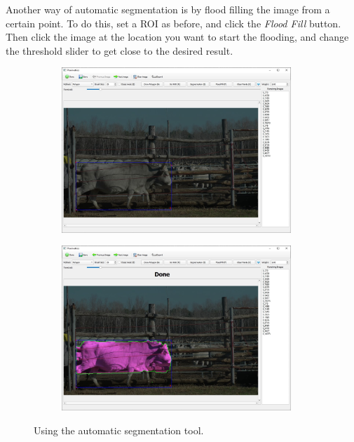 \documentclass[10pt,a4paper,oneside]{report}             %
\begin{document}
Another way of automatic segmentation is by flood filling the image from a certain point. To do this, set a ROI as before, and click the \textit{Flood Fill} button. Then click the image at the location you want to start the flooding, and change the threshold slider to get close to the desired result.

\begin{figure}[H]
	\centering
	\begin{subfigure}{\textwidth}
		\centering 
		\includegraphics[width=0.95\textwidth]{./images/PlaniROI.jpg}
	\end{subfigure}
	\begin{subfigure}{\textwidth}
		\centering 
		\includegraphics[width=0.95\textwidth]{./images/PlaniSeg.jpg}
	\end{subfigure}
	\caption[]
	{\small  Using the automatic segmentation tool.}
\end{figure} 
\end{document}
